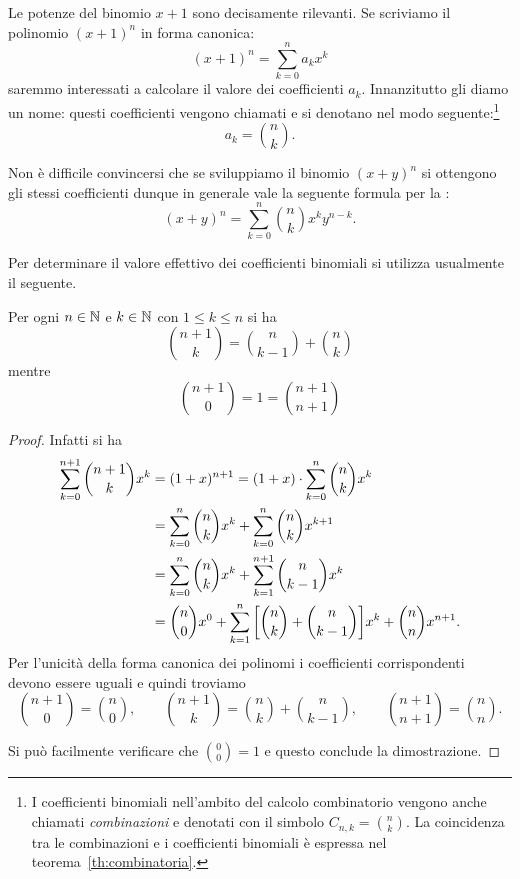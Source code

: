 Le potenze del binomio $x+1$ sono decisamente rilevanti. 
Se scriviamo il polinomio $(x+1)^n$ in forma canonica:
\[
  (x+1)^n = \sum_{k=0}^n a_k x^k  
\]
saremmo interessati a calcolare il valore
dei coefficienti $a_k$. 
Innanzitutto gli diamo un nome: questi coefficienti vengono chiamati 
%
e si denotano nel modo seguente:\footnote{%
I coefficienti binomiali nell'ambito del calcolo combinatorio 
vengono anche chiamati \emph{combinazioni}
e denotati con il simbolo $C_{n,k} = {n \choose k}$.
La coincidenza tra le combinazioni e i coefficienti binomiali 
è espressa nel teorema~\ref{th:combinatoria}.
}
\[
    a_k = {n \choose k}.
\]

Non è difficile convincersi che se sviluppiamo il binomio $(x+y)^n$
si ottengono gli stessi coefficienti dunque
in generale vale la seguente formula per la :
% 
\begin{equation*}
  (x+y)^n = \sum_{k=0}^n {n \choose k} x^k y^{n-k}. 
\end{equation*}

Per determinare il valore effettivo dei coefficienti 
binomiali si utilizza usualmente il seguente.
  
\begin{theorem}
\mymark{*}%
\label{th:tartaglia}%
Per ogni $n\in \mathbb N$ e $k \in \mathbb N$ con $1 \le k \le n$ si ha
\[
  {n+1 \choose k} =
      {n \choose k-1} + {n \choose k}
\]
mentre
\[
  {n+1 \choose 0} = 1 = {n+1 \choose n+1}
\]
\end{theorem}
  \begin{proof}
  Infatti si ha 
  \begin{align*}
    \sum_{k=0}^{n+1} {n+1 \choose k} x^k
    &= (1+x)^{n+1} 
    = (1+x)\cdot \sum_{k=0}^n {n \choose k} x^k \\
    &= \sum_{k=0}^n {n\choose k} x^k 
    + \sum_{k=0}^n {n\choose k} x^{k+1}\\
    &= \sum_{k=0}^n {n\choose k} x^k 
    + \sum_{k=1}^{n+1} {n\choose k-1} x^{k}\\
    &= {n\choose 0} x^0 
      + \sum_{k=1}^n {\left[ {n\choose k} + {n\choose k-1} \right]} x^k
      + {n \choose n} x^{n+1}.
    \end{align*}
  Per l'unicità della forma canonica dei polinomi 
  i coefficienti corrispondenti devono essere uguali e quindi 
  troviamo
  \[
  {n+1 \choose 0} = {n \choose 0}, \qquad 
  {n+1 \choose k} = {n \choose k} + {n \choose k-1}, \qquad 
  {n+1 \choose n+1} = {n \choose n}.
  \]

  Si può facilmente verificare che  ${0 \choose 0} = 1$ 
  e questo conclude la dimostrazione.
  \end{proof}
  
